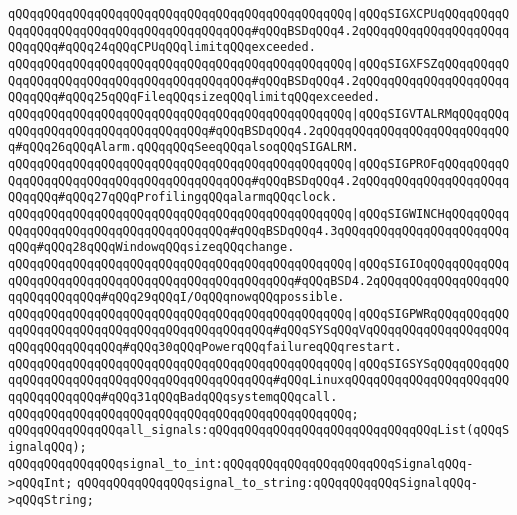 \verb|qQQqqQQqqQQqqQQqqQQqqQQqqQQqqQQqqQQqqQQqqQQqqQQq|\verb#|qQQqSIGXCPUqQQqqQQqqQQqqQQqqQQqqQQqqQQqqQQqqQQqqQQqqQQq#\verb|#qQQqBSDqQQq4.2qQQqqQQqqQQqqQQqqQQqqQQqqQQq#qQQq24qQQqCPUqQQqlimitqQQqexceeded.|\newline
\verb|qQQqqQQqqQQqqQQqqQQqqQQqqQQqqQQqqQQqqQQqqQQqqQQq|\verb#|qQQqSIGXFSZqQQqqQQqqQQqqQQqqQQqqQQqqQQqqQQqqQQqqQQqqQQq#\verb|#qQQqBSDqQQq4.2qQQqqQQqqQQqqQQqqQQqqQQqqQQq#qQQq25qQQqFileqQQqsizeqQQqlimitqQQqexceeded.|\newline
\verb|qQQqqQQqqQQqqQQqqQQqqQQqqQQqqQQqqQQqqQQqqQQqqQQq|\verb#|qQQqSIGVTALRMqQQqqQQqqQQqqQQqqQQqqQQqqQQqqQQqqQQq#\verb|#qQQqBSDqQQq4.2qQQqqQQqqQQqqQQqqQQqqQQqqQQq#qQQq26qQQqAlarm.qQQqqQQqSeeqQQqalsoqQQqSIGALRM.|\newline
\verb|qQQqqQQqqQQqqQQqqQQqqQQqqQQqqQQqqQQqqQQqqQQqqQQq|\verb#|qQQqSIGPROFqQQqqQQqqQQqqQQqqQQqqQQqqQQqqQQqqQQqqQQqqQQq#\verb|#qQQqBSDqQQq4.2qQQqqQQqqQQqqQQqqQQqqQQqqQQq#qQQq27qQQqProfilingqQQqalarmqQQqclock.|\newline
\verb|qQQqqQQqqQQqqQQqqQQqqQQqqQQqqQQqqQQqqQQqqQQqqQQq|\verb#|qQQqSIGWINCHqQQqqQQqqQQqqQQqqQQqqQQqqQQqqQQqqQQqqQQq#\verb|#qQQqBSDqQQq4.3qQQqqQQqqQQqqQQqqQQqqQQqqQQq#qQQq28qQQqWindowqQQqsizeqQQqchange.|\newline
\verb|qQQqqQQqqQQqqQQqqQQqqQQqqQQqqQQqqQQqqQQqqQQqqQQq|\verb#|qQQqSIGIOqQQqqQQqqQQqqQQqqQQqqQQqqQQqqQQqqQQqqQQqqQQqqQQqqQQq#\verb|#qQQqBSD4.2qQQqqQQqqQQqqQQqqQQqqQQqqQQqqQQq#qQQq29qQQqI/OqQQqnowqQQqpossible.|\newline
\verb|qQQqqQQqqQQqqQQqqQQqqQQqqQQqqQQqqQQqqQQqqQQqqQQq|\verb#|qQQqSIGPWRqQQqqQQqqQQqqQQqqQQqqQQqqQQqqQQqqQQqqQQqqQQqqQQq#\verb|#qQQqSYSqQQqVqQQqqQQqqQQqqQQqqQQqqQQqqQQqqQQqqQQq#qQQq30qQQqPowerqQQqfailureqQQqrestart.|\newline
\verb|qQQqqQQqqQQqqQQqqQQqqQQqqQQqqQQqqQQqqQQqqQQqqQQq|\verb#|qQQqSIGSYSqQQqqQQqqQQqqQQqqQQqqQQqqQQqqQQqqQQqqQQqqQQqqQQq#\verb|#qQQqLinuxqQQqqQQqqQQqqQQqqQQqqQQqqQQqqQQqqQQq#qQQq31qQQqBadqQQqsystemqQQqcall.|\newline
\verb|qQQqqQQqqQQqqQQqqQQqqQQqqQQqqQQqqQQqqQQqqQQqqQQq;|\newline
\newline
\verb|qQQqqQQqqQQqqQQqall_signals:qQQqqQQqqQQqqQQqqQQqqQQqqQQqqQQqList(qQQqSignalqQQq);|\newline
\newline
\verb|qQQqqQQqqQQqqQQqsignal_to_int:qQQqqQQqqQQqqQQqqQQqqQQqSignalqQQq->qQQqInt;|\newline
\verb|qQQqqQQqqQQqqQQqsignal_to_string:qQQqqQQqqQQqSignalqQQq->qQQqString;|\newline
